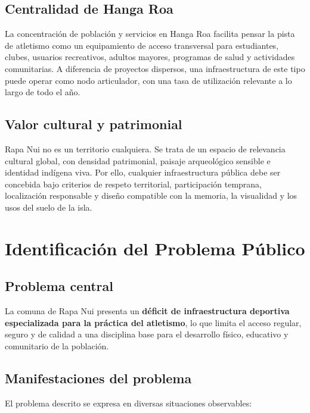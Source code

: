 \documentclass[12pt,letterpaper]{article}
\begin{document}
\subsection{Centralidad de Hanga Roa}

La concentración de población y servicios en Hanga Roa facilita pensar la pista de atletismo como un equipamiento de acceso transversal para estudiantes, clubes, usuarios recreativos, adultos mayores, programas de salud y actividades comunitarias. A diferencia de proyectos dispersos, una infraestructura de este tipo puede operar como nodo articulador, con una tasa de utilización relevante a lo largo de todo el año.

\subsection{Valor cultural y patrimonial}

Rapa Nui no es un territorio cualquiera. Se trata de un espacio de relevancia cultural global, con densidad patrimonial, paisaje arqueológico sensible e identidad indígena viva. Por ello, cualquier infraestructura pública debe ser concebida bajo criterios de respeto territorial, participación temprana, localización responsable y diseño compatible con la memoria, la visualidad y los usos del suelo de la isla.

\section{Identificación del Problema Público}

\subsection{Problema central}

La comuna de Rapa Nui presenta un \textbf{déficit de infraestructura deportiva especializada para la práctica del atletismo}, lo que limita el acceso regular, seguro y de calidad a una disciplina base para el desarrollo físico, educativo y comunitario de la población.

\subsection{Manifestaciones del problema}

El problema descrito se expresa en diversas situaciones observables:
\end{document}

